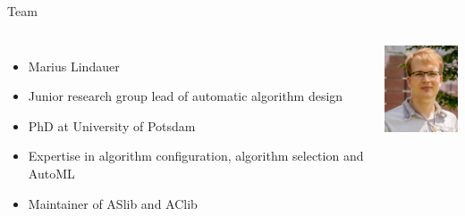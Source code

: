 % 
% 
\begin{frame}[c]{Team}

\begin{columns}[T]
\begin{itemize}
  \item Marius Lindauer
  \item Junior research group lead of automatic algorithm design
  \item PhD at University of Potsdam
  \item Expertise in algorithm configuration, algorithm selection and AutoML
  \item Maintainer of ASlib and AClib
\end{itemize}

\includegraphics[width=6.7em]{images/team/marius}
\end{columns}

\end{frame}
